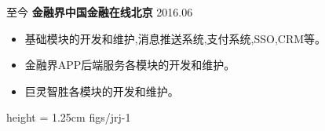 %
%
%
%
%

\begin{experiences}
	\experience
    {至今}	{\textbf{金融界}}{\textbf{中国金融在线}}{\textbf{北京}}
    {2016.06}	{
    	 \begin{itemize}
    		  \item 基础模块的开发和维护,消息推送系统,支付系统,SSO,CRM等。
              \item 金融界APP后端服务各模块的开发和维护。
              \item 巨灵智胜各模块的开发和维护。
    	 \end{itemize}
    			}
                {}
     {height = 1.25cm}		{figs/jrj-1}
	\emptySeparator
\end{experiences}
